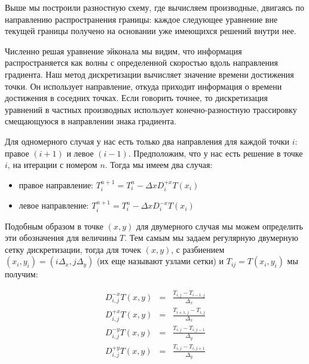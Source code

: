 \documentclass[a4paper,12pt]{article}
\begin{document}
Выше мы построили разностную схему, где вычисляем производные, двигаясь
по направлению распространения границы: каждое следующее уравнение вне
текущей границы получено на основании уже имеющихся решений внутри
нее.

Численно решая уравнение эйконала мы видим, что информация
распространяется как волны с определенной скоростью вдоль направления
градиента. Наш метод дискретизации вычисляет значение времени
достижения точки. Он использует направление, откуда приходит
информация о времени достижения в соседних точках. Если говорить
точнее, то дискретизация уравнений в частных производных использует
конечно-разностную трассировку смещающуюся в направлении знака
градиента.

Для одномерного случая у нас есть только два направления для каждой
точки $i$: правое $(i+1)$ и левое $(i - 1)$. Предположим, что у нас
есть решение в точке $i$, на итерации с номером $n$. Тогда мы имеем
два случая:
\begin{itemize}
\item правое направление: $T_i^{n+1} = T_i^n - \Delta x D^{+x}_iT(x_i)$
\item левое направление: $T_i^{n+1} = T_i^n - \Delta x D^{-x}_iT(x_i)$
\end{itemize}


Подобным образом в точке $(x,y)$ для двумерного случая мы можем
определить эти обозначения для величины $T$. Тем самым мы задаем
регулярную двумерную сетку дискретизации, тогда для точек $(x,y)$, с
разбиением $(x_i,y_i) = (i\Delta_x,j \Delta_y)$ (их еще называют
узлами сетки) и $T_{ij} = T(x_i,y_i)$ мы получим:

\begin{equation}
  \begin{aligned}
  \label{eq:discrete-defines}
    D^{-x}_{i,j}T(x,y) &=& \frac{T_{i,j} - T_{i-1,j}}{\Delta_x}  \\
    D^{+x}_{i,j}T(x,y) &=& \frac{T_{i+1,j} - T_{i,j}}{\Delta_x}  \\
    D^{-y}_{i,j}T(x,y) &=& \frac{T_{i,j} - T_{i,j-1}}{\Delta_y}  \\
    D^{+y}_{i,j}T(x,y) &=& \frac{T_{i,j} - T_{i,j+1}}{\Delta_y}
    \end{aligned}
\end{equation}
\end{document}
